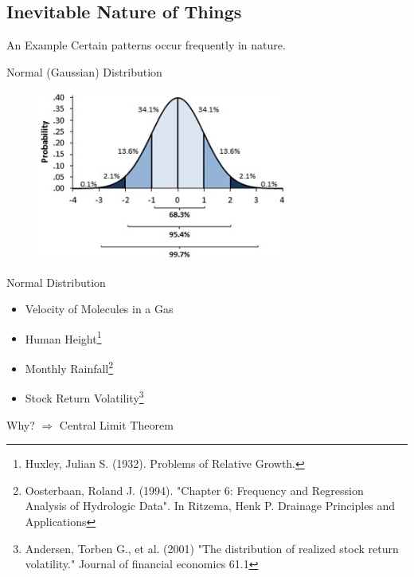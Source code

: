 \documentclass{beamer}
\begin{document}
\subsection{Inevitable Nature of Things}
\begin{frame}{An Example}
Certain patterns occur frequently in nature. \pause 
 \begin{block}{
 Normal (Gaussian) Distribution}
\end{block} \pause
		\begin{figure}
	  		\vspace*{0.1cm}
			\centering
			\includegraphics[trim = 0mm 0mm 0mm 0mm, clip, width=8.2cm]{normal.jpg}
			\label{fig:res4}
		\end{figure}
\end{frame}

\begin{frame}{Normal Distribution}
\begin{itemize}
\item{Velocity of Molecules in a Gas } \pause
\item{Human Height\footnote{Huxley, Julian S. (1932). Problems of Relative Growth.}} \pause
\item{Monthly Rainfall\footnote{Oosterbaan, Roland J. (1994). "Chapter 6: Frequency and Regression Analysis of Hydrologic Data". In Ritzema, Henk P. Drainage Principles and Applications}} \pause
\item{Stock Return Volatility\footnote{Andersen, Torben G., et al. (2001) "The distribution of realized stock return volatility." Journal of financial economics 61.1}} \pause
\end{itemize}
 \begin{block}{Why? $\Longrightarrow$ Central Limit Theorem}
\end{block}
\end{frame}
\end{document}
